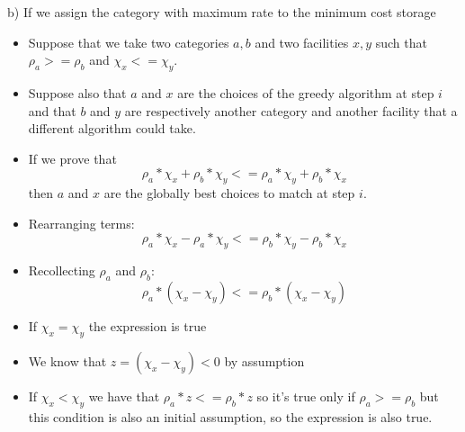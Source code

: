 \documentclass[]{article}
\begin{document}
b) If we assign the category with maximum rate to the minimum cost storage
\begin{itemize}
  \item Suppose that we take two categories $a, b$ and two facilities $x, y$ such
    that $\rho_a >= \rho_b$ and $\chi_x <= \chi_y$.
  \item Suppose also that $a$ and $x$ are the choices of the greedy algorithm at step $i$
    and that $b$ and $y$ are respectively another category and another facility that a different algorithm could take.
  \item If we prove that $$\rho_a * \chi_x + \rho_b * \chi_y <= \rho_a * \chi_y + \rho_b * \chi_x$$
    then $a$ and $x$ are the globally best choices to match at step $i$.
  \item Rearranging terms:
    $$\rho_a * \chi_x - \rho_a * \chi_y <= \rho_b * \chi_y - \rho_b * \chi_x$$
  \item Recollecting $\rho_a$ and $\rho_b$:
    $$\rho_a * (\chi_x - \chi_y) <= \rho_b * (\chi_x - \chi_y)$$
  \item If $\chi_x = \chi_y$ the expression is true
  \item We know that $z = (\chi_x - \chi_y) < 0$ by assumption
  \item If $\chi_x < \chi_y$ we have that $\rho_a * z <= \rho_b * z$
    so it's true only if $\rho_a >= \rho_b$ but this condition is also an initial assumption, so the expression is also true.
\end{itemize}
\end{document}
